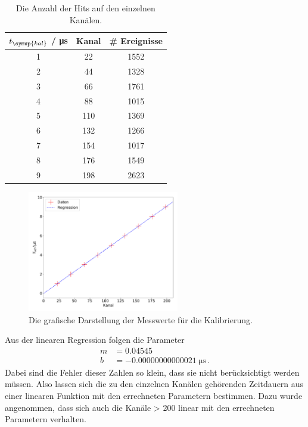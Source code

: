 \documentclass[
  bibliography=totoc,     %
  captions=tableheading,  %
  titlepage=firstiscover, %
]{scrartcl}
\begin{document}
\begin{table}[H]
\centering
\begin{tabular}{c c c}
  \toprule
  $t_{\symup{kal}}$ / \si{\micro\second} & Kanal & \# Ereignisse \\
  \midrule
  1 & 22 & 1552 \\
  2 & 44 & 1328 \\
  3 & 66 & 1761 \\
  4 & 88 & 1015 \\
  5 & 110 & 1369 \\
  6 & 132 & 1266 \\
  7 & 154 & 1017 \\
  8 & 176 & 1549 \\
  9 & 198 & 2623 \\
  \bottomrule
\end{tabular}
  \caption{Die Anzahl der Hits auf den einzelnen Kanälen.}
  \label{tab:2}
\end{table}


\begin{figure}
  \centering
  \includegraphics[width=0.59\textwidth]{kal16.pdf}
  \caption{Die grafische Darstellung der Messwerte für die Kalibrierung.}
  \label{fig:2}
\end{figure}
Aus der linearen Regression folgen die Parameter
\begin{align}
  m &= \num{0,04545} \\
  b &= \SI{-0,00000000000021}{\micro\second} \, .
\end{align}
Dabei sind die Fehler dieser Zahlen so klein, dass sie
nicht berücksichtigt werden müssen. Also lassen sich die zu den einzelnen
Kanälen gehörenden Zeitdauern aus einer linearen Funktion mit den errechneten
Parametern bestimmen. Dazu wurde angenommen, dass sich auch die Kanäle > 200
linear mit den errechneten Parametern verhalten.
\end{document}
